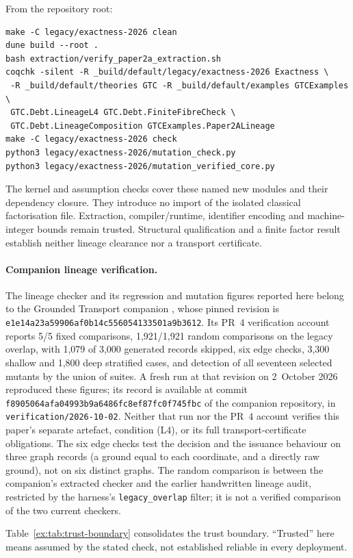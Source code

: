 \documentclass[11pt]{article}
\theoremstyle{definition}
\begin{document}
From the repository root:
\begin{verbatim}
make -C legacy/exactness-2026 clean
dune build --root .
bash extraction/verify_paper2a_extraction.sh
coqchk -silent -R _build/default/legacy/exactness-2026 Exactness \
 -R _build/default/theories GTC -R _build/default/examples GTCExamples \
 GTC.Debt.LineageL4 GTC.Debt.FiniteFibreCheck \
 GTC.Debt.LineageComposition GTCExamples.Paper2ALineage
make -C legacy/exactness-2026 check
python3 legacy/exactness-2026/mutation_check.py
python3 legacy/exactness-2026/mutation_verified_core.py
\end{verbatim}
The kernel and assumption checks cover these named new modules and their dependency closure. They introduce no import of the isolated classical factorisation file. Extraction, compiler/runtime, identifier encoding and machine-integer bounds remain trusted. Structural qualification and a finite factor result establish neither lineage clearance nor a transport certificate.

\paragraph{Companion lineage verification.}
The lineage checker and its regression and mutation figures reported
here belong to the Grounded Transport companion
\citep{moore2026transport}, whose pinned revision is
\nolinkurl{e1e14a23a59906af0b14c556054133501a9b3612}.
Its PR~4 verification account reports 5/5 fixed comparisons,
1,921/1,921 random comparisons on the legacy overlap, with
1,079 of 3,000 generated records skipped, six edge checks,
3,300 shallow and 1,800 deep stratified cases, and detection
of all seventeen selected mutants by the union of suites.
A fresh run at that revision on 2~October 2026 reproduced these
figures; its record is available at commit
\nolinkurl{f8905064afa04993b9a6486fc8ef87fc0f745fbc} of the companion
repository, in \nolinkurl{verification/2026-10-02}. Neither that run nor the PR~4 account verifies this paper's
separate artefact, condition (L4), or its full transport-certificate
obligations.
The six edge checks test the decision and the issuance behaviour on
three graph records (a ground equal to each coordinate, and a directly raw
ground), not on six distinct graphs. The random comparison is between the
companion's extracted checker and the earlier handwritten lineage audit,
restricted by the harness's \nolinkurl{legacy_overlap} filter; it is not a
verified comparison of the two current checkers.

Table~\ref{ex:tab:trust-boundary} consolidates the trust boundary. ``Trusted'' here means assumed by the stated check, not established reliable in every deployment.
\end{document}
